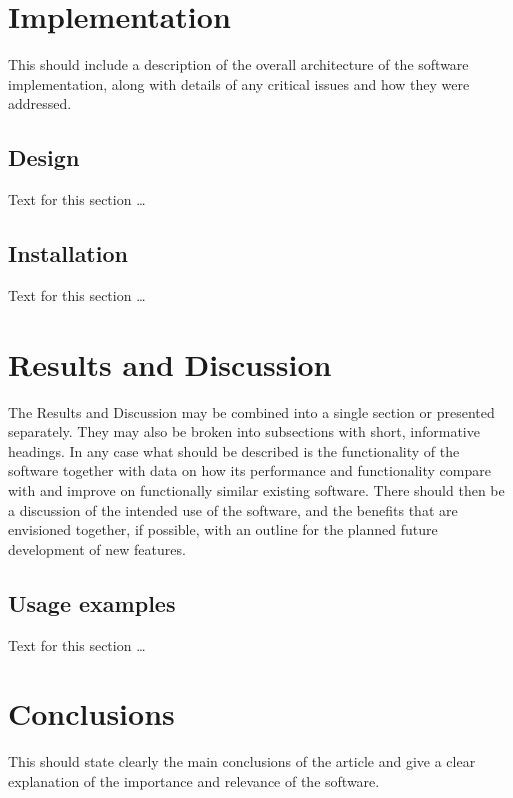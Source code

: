 \documentclass[10pt]{bmc_article}
\newenvironment{bmcformat}{\begin{raggedright}\baselineskip20pt\sloppy\setboolean{publ}{false}}{\end{raggedright}\baselineskip20pt\sloppy}
\begin{document}
\begin{bmcformat}
\section*{Implementation}
This should include a description of the overall architecture of the software 
implementation, along with details of any critical issues and how they were addressed.

  \subsection*{Design}
  Text for this section \ldots

  \subsection*{Installation}
  Text for this section \ldots

\section*{Results and Discussion}
The Results and Discussion may be combined into a single section or presented separately. 
They may also be broken into subsections with short, informative headings. In any case 
what should be described is the functionality of the software together with data on how 
its performance and functionality compare with and improve on functionally similar 
existing software. There should then be a discussion of the intended use of the software, 
and the benefits that are envisioned together, if possible, with an outline for the 
planned future development of new features.

  \subsection*{Usage examples}
  Text for this section \ldots


\section*{Conclusions}
This should state clearly the main conclusions of the article and give a clear explanation 
of the importance and relevance of the software.
  

\end{bmcformat}
\end{document}

